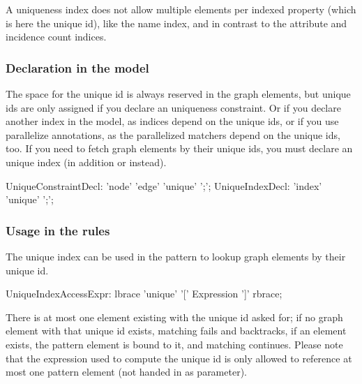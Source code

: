 A uniqueness index does not allow multiple elements per indexed property (which is here the unique id), like the name index, and in contrast to the attribute and incidence count indices.

\subsubsection*{Declaration in the model}
The space for the unique id is always reserved in the graph elements, but unique ids are only assigned if you declare an uniqueness constraint.
Or if you declare another index in the model, as indices depend on the unique ids, or if you use parallelize annotations, as the parallelized matchers depend on the unique ids, too.
If you need to fetch graph elements by their unique ids, you must declare an unique index (in addition or instead).

\begin{rail}
  UniqueConstraintDecl: 'node' 'edge' 'unique' ';';
  UniqueIndexDecl: 'index' 'unique' ';';
\end{rail}


\subsubsection*{Usage in the rules}
The unique index can be used in the pattern to lookup graph elements by their unique id.

\begin{rail}
  UniqueIndexAccessExpr:
    lbrace 'unique' '[' Expression ']' rbrace;
\end{rail}

There is at most one element existing with the unique id asked for; if no graph element with that unique id exists, matching fails and backtracks, if an element exists, the pattern element is bound to it, and matching continues.
Please note that the expression used to compute the unique id is only allowed to reference at most one pattern element (not handed in as parameter).

